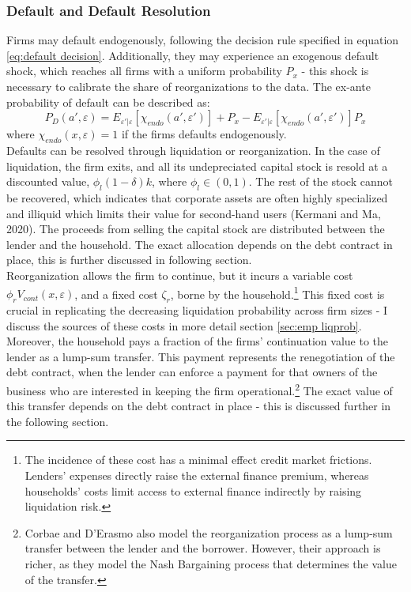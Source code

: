 \documentclass[12pt]{article}
\begin{document}
\subsubsection{Default and Default Resolution} \label{sec:default resolution}
Firms may default endogenously, following the decision rule specified in equation \ref{eq:default decision}. Additionally, they may experience an exogenous default shock, which reaches all firms with a uniform probability $P_{x}$ - this shock is necessary to calibrate the share of reorganizations to the data. The ex-ante probability of default can be described as: 
\begin{equation} \label{eq:default probability}
 P_D(a', \varepsilon) = E_{\varepsilon'|\varepsilon}[\chi_{endo}(a',\varepsilon')] + P_{x} - E_{\varepsilon'|\varepsilon}[\chi_{endo}(a',\varepsilon')]P_{x}
\end{equation}
where $\chi_{endo}(x, \varepsilon) = 1$ if the firms defaults endogenously. \vspace{3mm} \\ 
Defaults can be resolved through liquidation or reorganization. In the case of liquidation, the firm exits, and all its undepreciated capital stock is resold at a discounted value, $\phi_l(1-\delta)k$, where $\phi_l \in (0,1)$. The rest of the stock cannot be recovered, which indicates that corporate assets are often highly specialized and illiquid which limits their value for second-hand users (Kermani and Ma, 2020). The proceeds from selling the capital stock are distributed between the lender and the household. The exact allocation depends on the debt contract in place, this is further discussed in following section. \vspace{3mm} \\
Reorganization allows the firm to continue, but it incurs a variable cost $\phi_r V_{cont}(x,\varepsilon)$, and a fixed cost $\zeta_r$, borne by the household.\footnote{The incidence of these cost has a minimal effect credit market frictions. Lenders' expenses directly raise the external finance premium, whereas households' costs limit access to external finance indirectly by raising liquidation risk.} This fixed cost is crucial in replicating the decreasing liquidation probability across firm sizes - I discuss the sources of these costs in more detail section \ref{sec:emp liqprob}. Moreover, the household pays a fraction of the firms' continuation value to the lender as a lump-sum transfer. This payment represents the renegotiation of the debt contract, when the lender can enforce a payment for that owners of the business who are interested in keeping the firm operational.\footnote{Corbae and D'Erasmo also model the reorganization process as a lump-sum transfer between the lender and the borrower. However, their approach is richer, as they model the Nash Bargaining process that determines the value of the transfer.} The exact value of this transfer depends on the debt contract in place - this is discussed further in the following section. \vspace{3mm} \\
\end{document}
